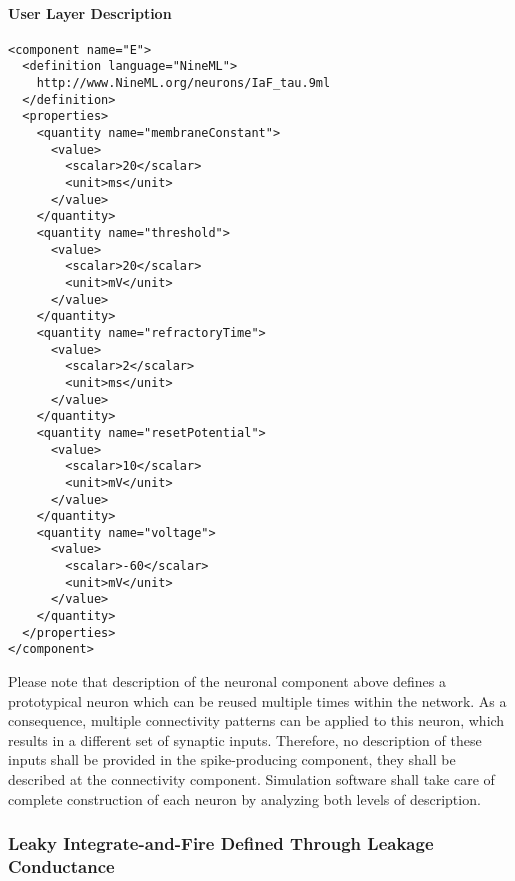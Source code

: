 \documentclass{article}
\begin{document}
\paragraph{User Layer Description}
\begin{verbatim}
<component name="E">
  <definition language="NineML">
    http://www.NineML.org/neurons/IaF_tau.9ml
  </definition>
  <properties>
    <quantity name="membraneConstant">
      <value>
        <scalar>20</scalar>
        <unit>ms</unit>
      </value>
    </quantity>
    <quantity name="threshold">
      <value>
        <scalar>20</scalar>
        <unit>mV</unit>
      </value>
    </quantity>
    <quantity name="refractoryTime">
      <value>
        <scalar>2</scalar>
        <unit>ms</unit>
      </value>
    </quantity>
    <quantity name="resetPotential">
      <value>
        <scalar>10</scalar>
        <unit>mV</unit>
      </value>
    </quantity>
    <quantity name="voltage">
      <value>
        <scalar>-60</scalar>
        <unit>mV</unit>
      </value>
    </quantity>
  </properties>
</component>
\end{verbatim}

Please note that description of the neuronal component above defines a prototypical
neuron which can be reused multiple times within the network. As a consequence,
multiple connectivity patterns can be applied to this neuron, which results in
a different set of synaptic inputs. Therefore, no description of these
inputs shall be provided in the spike-producing component, they shall be
described at the connectivity component. Simulation software shall take care of
complete construction of each neuron by analyzing both levels of description.

\subsubsection{Leaky Integrate-and-Fire Defined Through Leakage
Conductance}
\end{document}
